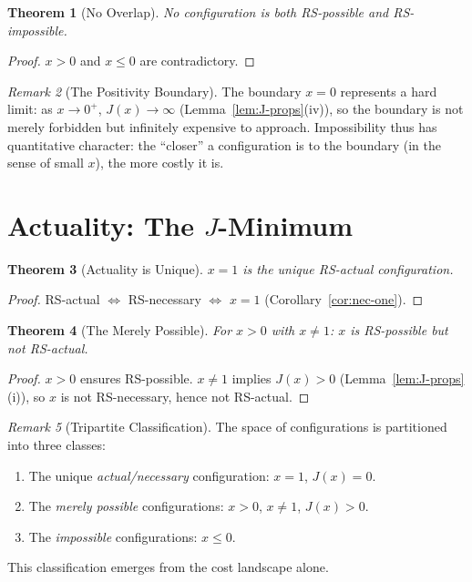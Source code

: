 \documentclass[12pt,a4paper]{article}
\newtheorem{theorem}{Theorem}[section]
\theoremstyle{definition}
\theoremstyle{remark}
\newtheorem{remark}[theorem]{Remark}
\begin{document}
\begin{theorem}[No Overlap]
\label{thm:no-overlap}
No configuration is both RS-possible and RS-impossible.
\end{theorem}

\begin{proof}
$x > 0$ and $x \leq 0$ are contradictory.
\end{proof}

\begin{remark}[The Positivity Boundary]
The boundary $x = 0$ represents a hard limit: as $x \to 0^+$,
$J(x) \to \infty$ (Lemma~\ref{lem:J-props}(iv)), so the boundary is
not merely forbidden but infinitely expensive to approach.
Impossibility thus has quantitative character: the ``closer'' a
configuration is to the boundary (in the sense of small $x$), the more
costly it is.
\end{remark}

\section{Actuality: The $J$-Minimum}
\label{sec:actuality}

\begin{theorem}[Actuality is Unique]
\label{thm:actual-unique}
$x = 1$ is the unique RS-actual configuration.
\end{theorem}

\begin{proof}
RS-actual $\Leftrightarrow$ RS-necessary $\Leftrightarrow$ $x = 1$
(Corollary~\ref{cor:nec-one}).
\end{proof}

\begin{theorem}[The Merely Possible]
\label{thm:merely-possible}
For $x > 0$ with $x \neq 1$: $x$ is RS-possible but not RS-actual.
\end{theorem}

\begin{proof}
$x > 0$ ensures RS-possible.  $x \neq 1$ implies $J(x) > 0$
(Lemma~\ref{lem:J-props}(i)), so $x$ is not RS-necessary, hence not
RS-actual.
\end{proof}

\begin{remark}[Tripartite Classification]
The space of configurations is partitioned into three classes:
\begin{enumerate}[nosep,label=(\alph*)]
  \item The unique \emph{actual/necessary} configuration: $x = 1$,
  $J(x) = 0$.
  \item The \emph{merely possible} configurations: $x > 0$, $x \neq 1$,
  $J(x) > 0$.
  \item The \emph{impossible} configurations: $x \leq 0$.
\end{enumerate}
This classification emerges from the cost landscape alone.
\end{remark}
\end{document}
